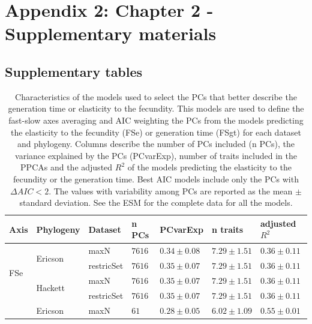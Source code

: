 \chapter{Appendix 2: Chapter 2 - Supplementary materials}\label{ch:Appendix2.1}

\renewcommand{\thefigure}{A.2.\arabic{figure}}
\setcounter{figure}{0}

\renewcommand{\thetable}{A.2.\arabic{table}}
\setcounter{table}{0}

\section*{Supplementary tables}

\begin{table}[ht!]
\center
\caption[FS PCs models]{
Characteristics of the models used to select the PCs that better describe the
generation time or elasticity to the fecundity. This models are used to
define the fast-slow axes averaging and AIC weighting the PCs from the models
predicting the elasticity to the fecundity (FSe) or generation time (FSgt)
for each dataset and phylogeny. Columns describe the number of PCs included (n
PCs), the variance explained by the PCs (PCvarExp), number of traits included in
the PPCAs and the adjusted $R^{2}$ of the models predicting the elasticity to
the fecundity or the generation time. Best AIC models include only the PCs
with $\Delta AIC < 2$. The values with variability among PCs are reported as the
mean $\pm$ standard deviation. See the ESM for the complete data for all the
models.
}
\label{tab:tabApp2.1}
\begin{tabular}{@{}lllllll@{}}
\toprule
Axis & Phylogeny & Dataset & n PCs & PCvarExp & n traits & adjusted $R^{2}$\\
\midrule
\multirow{4}{*}{FSe} & \multirow{2}{*}{Ericson} & maxN & $7616$ & $0.34\pm0.08$ & $7.29\pm1.51$ & $0.36\pm0.11$\\
 &  & restricSet & $7616$ & $0.35\pm0.07$ & $7.29\pm1.51$ & $0.36\pm0.11$\\
 & \multirow{2}{*}{Hackett}& maxN & $7616$ & $0.35\pm0.07$ & $7.29\pm1.51$ & $0.36\pm0.11$\\
 &  & restricSet & $7616$ & $0.35\pm0.07$ & $7.29\pm1.51$ & $0.36\pm0.11$\\
\addlinespace
\multirow{4}{*}{FSe best AIC} & \multirow{2}{*}{Ericson} & maxN & $61$ &
$0.28\pm0.05$ & $6.02\pm1.09$ & $0.55\pm0.01$\\

\end{tabular}
\end{table}

